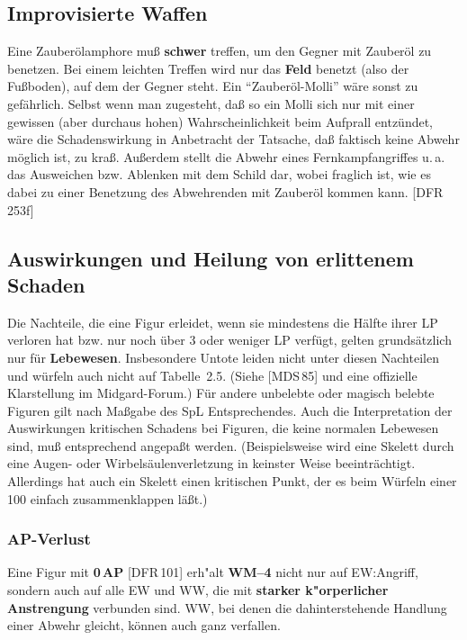 \documentclass[10pt,a4paper,germanpar]{article}
\begin{document}
\subsection{Improvisierte Waffen}

Eine Zauberölamphore muß \textbf{schwer} treffen, um den Gegner mit
Zauberöl zu benetzen.  Bei einem leichten Treffen wird nur das
\textbf{Feld} benetzt (also der Fußboden), auf dem der Gegner steht.
Ein "`Zauberöl-Molli"' wäre sonst zu gefährlich. Selbst wenn man
zugesteht, daß so ein Molli sich nur mit einer gewissen (aber durchaus
hohen) Wahrscheinlichkeit beim Aufprall entzündet, wäre die
Schadenswirkung in Anbetracht der Tatsache, daß faktisch keine Abwehr
möglich ist, zu kraß. Außerdem stellt die Abwehr eines
Fernkampfangriffes u.\,a. das Ausweichen bzw. Ablenken mit dem Schild
dar, wobei fraglich ist, wie es dabei zu einer Benetzung des
Abwehrenden mit Zauberöl kommen kann. [DFR\,253f]

\subsection{Auswirkungen und Heilung von erlittenem Schaden}

Die Nachteile, die eine Figur erleidet, wenn sie mindestens die Hälfte
ihrer LP verloren hat bzw. nur noch über 3 oder weniger LP verfügt,
gelten grundsätzlich nur für \textbf{Lebewesen}. Insbesondere Untote
leiden nicht unter diesen Nachteilen und würfeln auch nicht auf
Tabelle~2.5. (Siehe [MDS\,85] und eine offizielle Klarstellung im
Midgard-Forum.) Für andere unbelebte oder magisch belebte Figuren gilt
nach Maßgabe des SpL Entsprechendes. Auch die Interpretation
der Auswirkungen kritischen Schadens bei Figuren, die keine normalen
Lebewesen sind, muß entsprechend angepaßt werden. (Beispielsweise wird
eine Skelett durch eine Augen- oder Wirbelsäulenverletzung in keinster
Weise beeinträchtigt. Allerdings hat auch ein Skelett einen kritischen
Punkt, der es beim Würfeln einer 100 einfach zusammenklappen läßt.)

\subsubsection{AP-Verlust}

Eine Figur mit \textbf{0\,AP} [DFR\,101] erh"alt \textbf{WM--4} nicht
nur auf EW:Angriff, sondern auch auf alle EW und WW, die mit
\textbf{starker k"orperlicher Anstrengung} verbunden sind. WW, bei
denen die dahinterstehende Handlung einer Abwehr gleicht, können
auch ganz verfallen.
\end{document}
